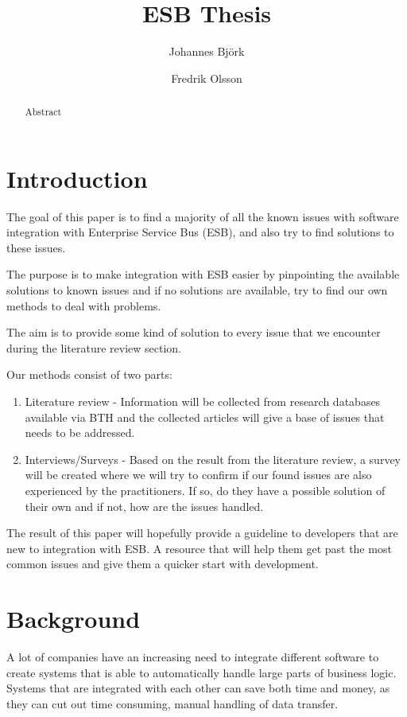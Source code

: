 \documentclass{llncs}
\title{ESB Thesis}
\author{Johannes Björk \inst{1} \and Fredrik Olsson \inst{1}}
\institute{
	Blekinge Institute of Technology \\
	\email{johannes@johannesbjork.se}, \email{spooky.bender@gmail.com}
}
\begin{document}
\maketitle

\begin{abstract}
Abstract
\end{abstract}

\section{Introduction}
The goal of this paper is to find a majority of all the known issues with software integration with Enterprise Service Bus (ESB), and also try to find solutions to these issues.

The purpose is to make integration with ESB easier by pinpointing the available solutions to known issues and if no solutions are available, try to find our own methods to deal with problems.

The aim is to provide some kind of solution to every issue that we encounter during the literature review section.

Our methods consist of two parts:
\begin{enumerate}
 \item Literature review - Information will be collected from research databases available via BTH and the collected articles will give a base of issues that needs to be addressed.
 \item Interviews/Surveys - Based on the result from the literature review, a survey will be created where we will try to confirm if our found issues are also experienced by the practitioners. If so, do they have a possible solution of their own and if not, how are the issues handled.
\end{enumerate}
The result of this paper will hopefully provide a guideline to developers that are new to integration with ESB. A resource that will help them get past the most common issues and give them a quicker start with development.

\newpage
\setcounter{tocdepth}{3}
\tableofcontents
\newpage

\section{Background}
A lot of companies have an increasing need to integrate different software to create systems that is able to automatically handle large parts of business logic. Systems that are integrated with each other can save both time and money, as they can cut out time consuming, manual handling of data transfer.
\end{document}
